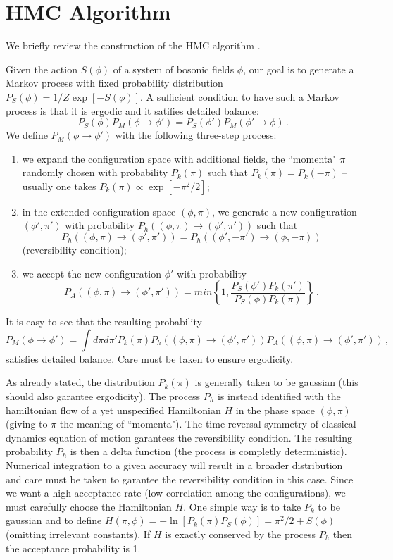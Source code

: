 \documentclass{article}[12pt]
\begin{document}
\section{HMC Algorithm}

We briefly review the construction of the HMC algorithm \cite{??}.

Given the action $S(\phi)$ of a system of bosonic fields $\phi$, our goal is to generate a Markov process with 
fixed probability distribution $P_S(\phi) = 1/Z \exp[-S(\phi) ]$. A sufficient condition to have such a 
Markov process is that it is ergodic and it satifies detailed balance:
\begin{equation}
P_S(\phi)P_M(\phi\rightarrow \phi') = P_S(\phi')P_M(\phi' \rightarrow \phi) \, .
\end{equation}
We define $P_M(\phi \rightarrow \phi')$ with the following three-step process:
\begin{enumerate}
\item we expand the configuration space with additional fields, the ``momenta" $\pi$ randomly chosen with probability
$P_k(\pi)$ such that $P_k(\pi)=P_k(-\pi)$ -- usually one takes $P_k(\pi)\propto \exp[-\pi^2/2]$; 
\item in the extended configuration space $(\phi, \pi)$, we generate a new configuration $(\phi',\pi')$ with probability
$P_h((\phi,\pi)\rightarrow(\phi',\pi'))$ such that 
\[P_h((\phi,\pi)\rightarrow(\phi',\pi')) = P_h((\phi',-\pi')\rightarrow(\phi,-\pi))\]
(reversibility condition);
\item we accept the new configuration $\phi'$ with probability 
\[P_A((\phi,\pi)\rightarrow(\phi',\pi')) = min \left\{ 1, \frac{P_S(\phi')P_k(\pi')}{P_S(\phi)P_k(\pi)} \right\} \, .\]
\end{enumerate}
It is easy to see that the resulting probability
\begin{equation}
P_M(\phi\rightarrow\phi') = \int d\pi d\pi' P_k(\pi) P_h((\phi,\pi)\rightarrow(\phi',\pi')) P_A((\phi,\pi)\rightarrow(\phi',\pi')) \, ,
\end{equation}
satisfies detailed balance. Care must be taken to ensure ergodicity.

As already stated, the distribution $P_k(\pi)$ is generally taken to be gaussian (this should also garantee ergodicity).
The process $P_h$ is instead identified with the hamiltonian flow of a yet unspecified Hamiltonian $H$ in the phase
space $(\phi,\pi)$ (giving to $\pi$ the meaning of ``momenta"). The time reversal symmetry of classical dynamics equation of motion
garantees the reversibility condition. The resulting probability $P_h$ is then a delta function (the process is completly deterministic).
Numerical integration to a given accuracy will result in a broader distribution and care must be taken to garantee the reversibility condition 
in this case.
Since we want a high acceptance rate (low correlation among the configurations), we must carefully choose the Hamiltonian $H$.
One simple way is to take $P_k$ to be gaussian and to define $H(\pi,\phi)=-\ln [P_k(\pi) P_S(\phi)] = \pi^2/2 + S(\phi)$ 
(omitting irrelevant constants). If $H$ is exactly conserved by the process $P_h$ then the acceptance probability is 1.
\end{document}
